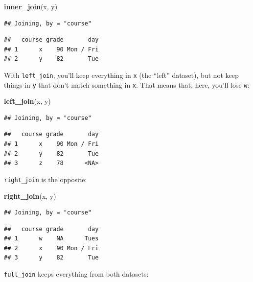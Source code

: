 \documentclass[]{book}
\makeatletter
\newenvironment{Shaded}{\begin{snugshade}}{\end{snugshade}}
\newcommand{\KeywordTok}[1]{\textcolor[rgb]{0.13,0.29,0.53}{\textbf{{#1}}}}
\newcommand{\NormalTok}[1]{{#1}}
\newenvironment{kframe}{%
\medskip{}
\setlength{\fboxsep}{.8em}
 \def\at@end@of@kframe{}%
 \ifinner\ifhmode%
  \def\at@end@of@kframe{\end{minipage}}%
  \begin{minipage}{\columnwidth}%
 \fi\fi%
 \def\FrameCommand##1{\hskip\@totalleftmargin \hskip-\fboxsep
 \colorbox{shadecolor}{##1}\hskip-\fboxsep
     \hskip-\linewidth \hskip-\@totalleftmargin \hskip\columnwidth}%
 \MakeFramed {\advance\hsize-\width
   \@totalleftmargin\z@ \linewidth\hsize
   \@setminipage}}%
 {\par\unskip\endMakeFramed%
 \at@end@of@kframe}
\renewenvironment{Shaded}{\begin{kframe}}{\end{kframe}}
\makeatother
\begin{document}
\begin{Shaded}
\begin{Highlighting}[]
\KeywordTok{inner_join}\NormalTok{(x, y)}
\end{Highlighting}
\end{Shaded}

\begin{verbatim}
## Joining, by = "course"
\end{verbatim}

\begin{verbatim}
##   course grade       day
## 1      x    90 Mon / Fri
## 2      y    82       Tue
\end{verbatim}

With \texttt{left\_join}, you'll keep everything in \texttt{x} (the
``left'' dataset), but not keep things in \texttt{y} that don't match
something in \texttt{x}. That means that, here, you'll lose \texttt{w}:

\begin{Shaded}
\begin{Highlighting}[]
\KeywordTok{left_join}\NormalTok{(x, y)}
\end{Highlighting}
\end{Shaded}

\begin{verbatim}
## Joining, by = "course"
\end{verbatim}

\begin{verbatim}
##   course grade       day
## 1      x    90 Mon / Fri
## 2      y    82       Tue
## 3      z    78      <NA>
\end{verbatim}

\texttt{right\_join} is the opposite:

\begin{Shaded}
\begin{Highlighting}[]
\KeywordTok{right_join}\NormalTok{(x, y)}
\end{Highlighting}
\end{Shaded}

\begin{verbatim}
## Joining, by = "course"
\end{verbatim}

\begin{verbatim}
##   course grade       day
## 1      w    NA      Tues
## 2      x    90 Mon / Fri
## 3      y    82       Tue
\end{verbatim}

\texttt{full\_join} keeps everything from both datasets:
\end{document}
